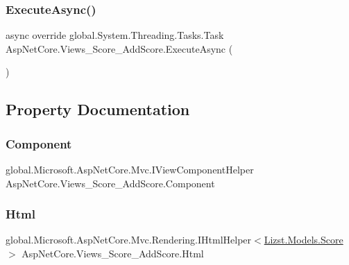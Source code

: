 \subsubsection{\texorpdfstring{ExecuteAsync()}{ExecuteAsync()}}
{\footnotesize\ttfamily async override global.\+System.\+Threading.\+Tasks.\+Task Asp\+Net\+Core.\+Views\+\_\+\+Score\+\_\+\+Add\+Score.\+Execute\+Async (\begin{DoxyParamCaption}{ }\end{DoxyParamCaption})}



\subsection{Property Documentation}
\mbox{\label{class_asp_net_core_1_1_views___score___add_score_ada0fd4cbf58c3883611476dcaf86d01e}} 
\subsubsection{\texorpdfstring{Component}{Component}}
{\footnotesize\ttfamily global.\+Microsoft.\+Asp\+Net\+Core.\+Mvc.\+I\+View\+Component\+Helper Asp\+Net\+Core.\+Views\+\_\+\+Score\+\_\+\+Add\+Score.\+Component\hspace{0.3cm}{\ttfamily [get]}}

\mbox{\label{class_asp_net_core_1_1_views___score___add_score_a03d08fd940dae1c72d38626b2a7d16e6}} 
\subsubsection{\texorpdfstring{Html}{Html}}
{\footnotesize\ttfamily global.\+Microsoft.\+Asp\+Net\+Core.\+Mvc.\+Rendering.\+I\+Html\+Helper$<$\mbox{\hyperlink{class_lizst_1_1_models_1_1_score}{Lizst.\+Models.\+Score}}$>$ Asp\+Net\+Core.\+Views\+\_\+\+Score\+\_\+\+Add\+Score.\+Html\hspace{0.3cm}{\ttfamily [get]}}

